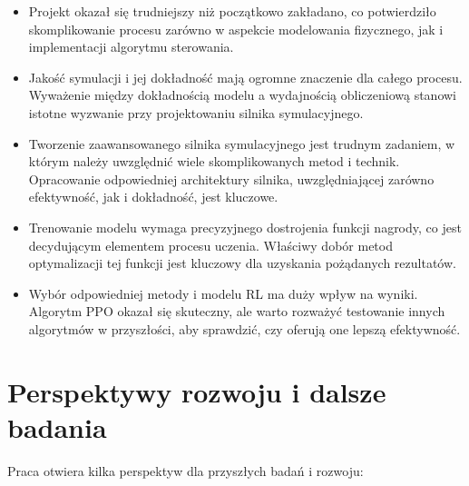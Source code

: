 \begin{itemize}
    \item Projekt okazał się trudniejszy niż początkowo zakładano, co
    potwierdziło skomplikowanie procesu zarówno w aspekcie modelowania fizycznego, jak i implementacji algorytmu sterowania.
    \item Jakość symulacji i jej dokładność mają ogromne znaczenie dla całego procesu. Wyważenie między dokładnością modelu a wydajnością obliczeniową stanowi istotne wyzwanie przy projektowaniu silnika symulacyjnego.
    \item Tworzenie zaawansowanego silnika symulacyjnego jest trudnym zadaniem, w którym należy uwzględnić wiele skomplikowanych metod i technik. Opracowanie odpowiedniej architektury silnika, uwzględniającej zarówno efektywność, jak i dokładność, jest kluczowe.
    \item Trenowanie modelu wymaga precyzyjnego dostrojenia funkcji nagrody, co jest decydującym elementem procesu uczenia. Właściwy dobór metod optymalizacji tej funkcji jest kluczowy dla uzyskania pożądanych rezultatów.
    \item Wybór odpowiedniej metody i modelu RL ma duży wpływ na wyniki. Algorytm PPO okazał się skuteczny, ale warto rozważyć testowanie innych algorytmów w przyszłości, aby sprawdzić, czy oferują one lepszą efektywność.

\end{itemize}

\section{Perspektywy rozwoju i dalsze badania}
Praca otwiera kilka perspektyw dla przyszłych badań i rozwoju:

